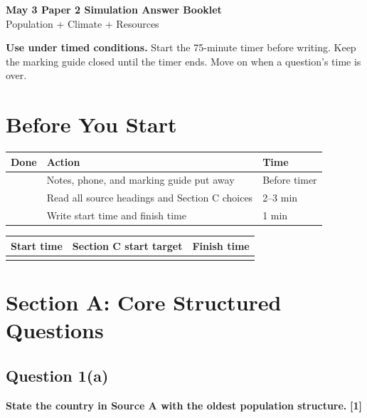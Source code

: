 \documentclass[11pt,a4paper]{article}
\newcommand{\todobox}{\fbox{\rule{0pt}{0.8em}\rule{0.8em}{0pt}}}
\begin{document}
\begin{center}
{\sffamily\bfseries\color{HeadingBlue}\LARGE May 3 Paper 2 Simulation Answer Booklet}\\[0.25em]
{\sffamily\color{AccentTeal}\large Population + Climate + Resources}
\end{center}

\noindent\colorbox{SoftBlue}{%
\begin{minipage}{0.965\textwidth}
\sffamily
\textbf{\textcolor{HeadingBlue}{Use under timed conditions.}}
Start the 75-minute timer before writing. Keep the marking guide closed until
the timer ends. Move on when a question's time is over.
\end{minipage}
}

\section{Before You Start}

\begin{tabularx}{\textwidth}{L{0.16\textwidth}Y L{0.19\textwidth}}
\toprule
\textbf{Done} & \textbf{Action} & \textbf{Time} \\
\midrule
\todobox & Notes, phone, and marking guide put away & Before timer \\
\todobox & Read all source headings and Section C choices & 2--3 min \\
\todobox & Write start time and finish time & 1 min \\
\bottomrule
\end{tabularx}

\vspace{0.3em}

\begin{tabularx}{\textwidth}{L{0.24\textwidth}Y Y}
\toprule
\textbf{Start time} & \textbf{Section C start target} & \textbf{Finish time} \\
\midrule
\rule{0pt}{1cm} & & \\
\bottomrule
\end{tabularx}

\newpage

\section{Section A: Core Structured Questions}

\subsection{Question 1(a)}
\textbf{State the country in Source A with the oldest population structure.}
\hfill \textbf{[1]}
\end{document}
